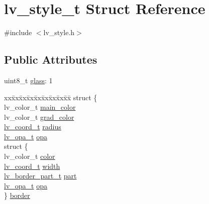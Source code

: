 \hypertarget{structlv__style__t}{}\section{lv\+\_\+style\+\_\+t Struct Reference}
\label{structlv__style__t}


{\ttfamily \#include $<$lv\+\_\+style.\+h$>$}

\subsection*{Public Attributes}
\begin{DoxyCompactItemize}
\item 
uint8\+\_\+t \mbox{\hyperlink{structlv__style__t_aae8f1e70a0a03f920a2a00534d31f600}{glass}}\+: 1
\item 
\begin{tabbing}
xx\=xx\=xx\=xx\=xx\=xx\=xx\=xx\=xx\=\kill
struct \{\\
\>lv\_color\_t \mbox{\hyperlink{structlv__style__t_abd9695a53c65094e64a1e6e83f8c4d20}{main\_color}}\\
\>lv\_color\_t \mbox{\hyperlink{structlv__style__t_a48db3d673d443b998bc8b531d201f46d}{grad\_color}}\\
\>\mbox{\hyperlink{lv__area_8h_ad98932f5017f20988532bb68b32a6d76}{lv\_coord\_t}} \mbox{\hyperlink{structlv__style__t_a4562ec9b4de4174dce2d8e6644ae02bf}{radius}}\\
\>\mbox{\hyperlink{lv__color_8h_acdb0f6245624d86b1cb002186fd6cf96}{lv\_opa\_t}} \mbox{\hyperlink{structlv__style__t_a2f097b676d0ea5b1c66afb931f3bee09}{opa}}\\
\>struct \{\\
\>\>lv\_color\_t \mbox{\hyperlink{structlv__style__t_a95f8063bcbbb1045f0c38514a234ce39}{color}}\\
\>\>\mbox{\hyperlink{lv__area_8h_ad98932f5017f20988532bb68b32a6d76}{lv\_coord\_t}} \mbox{\hyperlink{structlv__style__t_a1d894e253883ac892145735a36828976}{width}}\\
\>\>\mbox{\hyperlink{lv__style_8h_abd440f38c298ada996fc9fe217d1192a}{lv\_border\_part\_t}} \mbox{\hyperlink{structlv__style__t_a28b6e888d1741ebac32349fa00a89880}{part}}\\
\>\>\mbox{\hyperlink{lv__color_8h_acdb0f6245624d86b1cb002186fd6cf96}{lv\_opa\_t}} \mbox{\hyperlink{structlv__style__t_a2f097b676d0ea5b1c66afb931f3bee09}{opa}}\\
\>\} \mbox{\hyperlink{structlv__style__t_a852ab1f5f3a59f33f834bafd05d97046}{border}}\\

\end{tabbing}
\end{DoxyCompactItemize}
